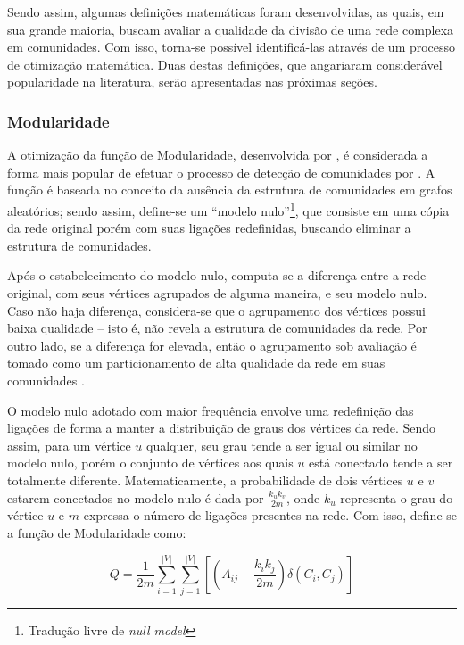 Sendo assim, algumas definições matemáticas foram desenvolvidas, as quais, em sua grande maioria, buscam avaliar a qualidade da divisão de uma rede complexa em comunidades. Com isso, torna-se possível identificá-las através de um processo de otimização matemática. Duas destas definições, que angariaram considerável popularidade na literatura, serão apresentadas nas próximas seções.

\subsubsection{Modularidade} \label{sec:modularity}

A otimização da função de Modularidade, desenvolvida por , é considerada a forma mais popular de efetuar o processo de detecção de comunidades por . A função é baseada no conceito da ausência da estrutura de comunidades em grafos aleatórios; sendo assim, define-se um ``modelo nulo''\footnote{Tradução livre de \textit{null model}}, que consiste em uma cópia da rede original porém com suas ligações redefinidas, buscando eliminar a estrutura de comunidades.

Após o estabelecimento do modelo nulo, computa-se a diferença entre a rede original, com seus vértices agrupados de alguma maneira, e seu modelo nulo. Caso não haja diferença, considera-se que o agrupamento dos vértices possui baixa qualidade -- isto é, não revela a estrutura de comunidades da rede. Por outro lado, se a diferença for elevada, então o agrupamento sob avaliação é tomado como um particionamento de alta qualidade da rede em suas comunidades \cite{Fortunato2010}.

O modelo nulo adotado com maior frequência envolve uma redefinição das ligações de forma a manter a distribuição de graus dos vértices da rede. Sendo assim, para um vértice $u$ qualquer, seu grau tende a ser igual ou similar no modelo nulo, porém o conjunto de vértices aos quais $u$ está conectado tende a ser totalmente diferente. Matematicamente, a probabilidade de dois vértices $u$ e $v$ estarem conectados no modelo nulo é dada por $\frac{k_uk_v}{2m}$, onde $k_u$ representa o grau do vértice $u$ e $m$ expressa o número de ligações presentes na rede. Com isso, define-se a função de Modularidade como:

\begin{equation}
    \label{eq:modularity}
    Q = \frac{1}{2m}\sum_{i=1}^{|V|}\sum_{j=1}^{|V|} \left [ \left ( A_{ij} - \frac{k_ik_j}{2m} \right ) \delta(C_i, C_j) \right ]
\end{equation}

